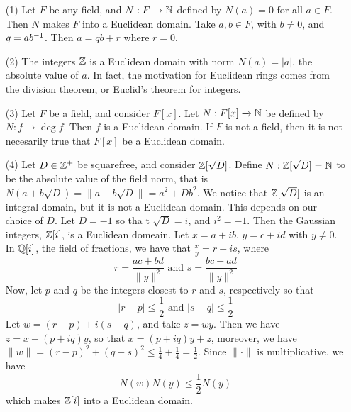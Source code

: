 \begin{example}\label{2.1}
    \begin{enumerate}
        \item[(1)] Let $F$ be any field, and  $N:F \xrightarrow{} \mathbb{N}$ defined by
            $N(a)=0$ for all $a \in F$. Then  $N$ makes  $F$ into a Euclidean
            domain. Take  $a,b \in F$, with  $b \neq 0$, and  $q=ab^{-1}$. Then
            $a=qb+r$ where  $r=0$.

        \item[(2)] The integers $\mathbb{Z}$ is a Euclidean domain with norm $N(a)=|a|$,
            the absolute value of $a$. In fact, the motivation for Euclidean
            rings comes from the division theorem, or Euclid's theorem for
            integers.

        \item[(3)] Let $F$ be a field, and consider  $F[x]$. Let $N:F[x]
            \xrightarrow{} \mathbb{N}$ be defined by $N:f \xrightarrow{} \deg{f}$. Then
            $f$ is a Euclidean domain. If  $F$ is not a field, then it is not
            necesarily true that $F[x]$ be a Euclidean domain.

        \item[(4)] Let $D \in \mathbb{Z}^+$ be squarefree, and consider  $\mathbb{Z}[\sqrt{D}]$.
            Define $N:\mathbb{Z}[\sqrt{D}]=\mathbb{N}$ to be the absolute value of the field
            norm, that is $N(a+b\sqrt{D})=\|a+b\sqrt{D}\|=a^2+Db^2$. We notice
            that $\mathbb{Z}[\sqrt{D}]$ is an integral domain, but it is not a Euclidean
            domain. This depends on our choice of $D$. Let  $D=-1$ so tha t
            $\sqrt{D}=i$, and $i^2=-1$. Then the Gaussian integers, $\mathbb{Z}[i]$, is
            a Euclidean domeain. Let $x=a+ib$,  $y=c+id$ with  $y \neq 0$. In
            $\mathbb{Q}[i]$, the field of fractions, we have that $\frac{x}{y}=r+is$,
            where
            \begin{equation*}
                r=\frac{ac+bd}{\|y\|^2} \text{ and } s=\frac{bc-ad}{\|y\|^2}
            \end{equation*}
            Now, let $p$ and  $q$ be the integers closest to $r$ and $s$,
            respectively so that
            \begin{equation*}
                |r-p| \leq \frac{1}{2} \text{ and } |s-q| \leq \frac{1}{2}
            \end{equation*}
            Let $w=(r-p)+i(s-q)$, and take $z=wy$. Then we have  $z=x-(p+iq)y$,
            so that $x=(p+iq)y+z$, moreover, we have $\|w\|=(r-p)^2+(q-s)^2 \leq
            \frac{1}{4}+\frac{1}{4}=\frac{1}{2}$. Since $\|\cdot\|$ is
            multiplicative, we have
            \begin{equation*}
                N(w)N(y) \leq \frac{1}{2}N(y)
            \end{equation*}
            which makes $\mathbb{Z}[i]$ into a Euclidean domain.


\end{enumerate}
\end{example}
